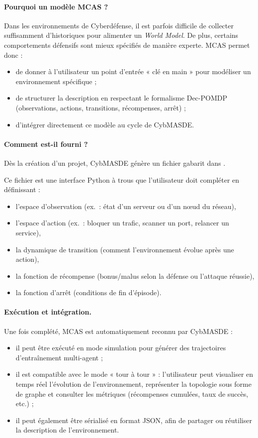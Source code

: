 \paragraph{Pourquoi un modèle MCAS ?}
Dans les environnements de Cyberdéfense, il est parfois difficile de collecter suffisamment d'historiques pour alimenter un \textit{World Model}. De plus, certains comportements défensifs sont mieux spécifiés de manière experte. MCAS permet donc :
\begin{itemize}
  \item de donner à l'utilisateur un point d'entrée « clé en main » pour modéliser un environnement spécifique ;
  \item de structurer la description en respectant le formalisme Dec-POMDP (observations, actions, transitions, récompenses, arrêt) ;
  \item d'intégrer directement ce modèle au cycle de CybMASDE.
\end{itemize}

\paragraph{Comment est-il fourni ?}
Dès la création d'un projet, CybMASDE génère un fichier gabarit dans .

Ce fichier est une interface Python à trous que l'utilisateur doit compléter en définissant :
\begin{itemize}
  \item l'espace d'observation (ex.~: état d'un serveur ou d'un nœud du réseau),
  \item l'espace d'action (ex.~: bloquer un trafic, scanner un port, relancer un service),
  \item la dynamique de transition (comment l'environnement évolue après une action),
  \item la fonction de récompense (bonus/malus selon la défense ou l'attaque réussie),
  \item la fonction d'arrêt (conditions de fin d'épisode).
\end{itemize}

\paragraph{Exécution et intégration.}
Une fois complété, MCAS est automatiquement reconnu par CybMASDE :
\begin{itemize}
  \item il peut être exécuté en mode simulation pour générer des trajectoires d'entraînement multi-agent ;
  \item il est compatible avec le mode « tour à tour » : l'utilisateur peut visualiser en temps réel l'évolution de l'environnement, représenter la topologie sous forme de graphe et consulter les métriques (récompenses cumulées, taux de succès, etc.) ;
  \item il peut également être sérialisé en format JSON, afin de partager ou réutiliser la description de l'environnement.
\end{itemize}

